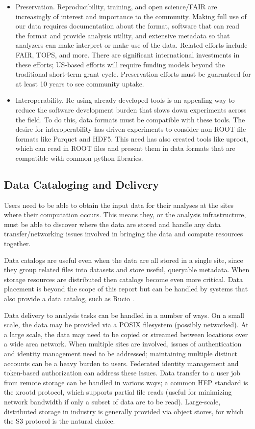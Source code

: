 \begin{itemize}
  \item Preservation.  Reproducibility, training, and open science/FAIR are increasingly of interest and importance to the community.  Making full use of our data requires documentation about the format, software that can read the format and provide analysis utility, and extensive metadata so that analyzers can make interpret or make use of the data.  Related efforts include FAIR, TOPS, and more.  There are significant international investments in these efforts; US-based efforts will require funding models beyond the traditional short-term grant cycle.  Preservation efforts must be guaranteed for at least 10 years to see community uptake.
  \item Interoperability. Re-using already-developed tools is an appealing way to reduce the software development burden that slows down experiments across the field.  To do this, data formats must be compatible with these tools.  The desire for interoperability has driven experiments to consider non-ROOT file formats like Parquet and HDF5.  This need has also created tools like uproot, which can read in ROOT files and present them in data formats that are compatible with common python libraries.
\end{itemize} 


\subsection{Data Cataloging and Delivery}

Users need to be able to obtain the input data for their analyses at the sites where their computation occurs. This means they, or the analysis infrastructure, must be able to discover where the data are stored and handle any data transfer/networking issues involved in bringing the data and compute resources together.

Data catalogs are useful even when the data are all stored in a single site, since they group related files into datasets and store useful, queryable metadata. When storage resources are distributed then catalogs become even more critical. Data placement is beyond the scope of this report but can be handled by systems that also provide a data catalog, such as Rucio \cite{Barisits:2019fyl}.

Data delivery to analysis tasks can be handled in a number of ways. On a small scale, the data may be provided via a POSIX filesystem (possibly networked). At a large scale, the data may need to be copied or streamed between locations over a wide area network. When multiple sites are involved, issues of authentication and identity management need to be addressed; maintaining multiple distinct accounts can be a heavy burden to users. Federated identity management and token-based authorization can address these issues.  Data transfer to a user job from remote storage can be handled in various ways; a common HEP standard is the xrootd protocol, which supports partial file reads (useful for minimizing network bandwidth if only a subset of data are to be read). Large-scale, distributed storage in industry is generally provided via object stores, for which the S3 protocol is the natural choice.


